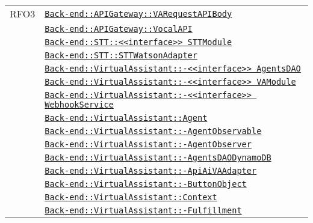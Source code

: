 \begin{longtable}{|>{\centering}m{3cm}|m{10cm}<{\centering}|}
RFO3 & \hyperref[Back-end::APIGateway::VARequestAPIBody]{\texttt{Back-end::APIGateway::VARequestAPIBody}}\\
& \hyperref[Back-end::APIGateway::VocalAPI]{\texttt{Back-end::APIGateway::VocalAPI}}\\
& \hyperref[Back-end::STT::<<interface>> STTModule]{\texttt{Back-end::STT::<<interface>> STTModule}}\\
& \hyperref[Back-end::STT::STTWatsonAdapter]{\texttt{Back-end::STT::STTWatsonAdapter}}\\
& \hyperref[Back-end::VirtualAssistant::<<interface>> AgentsDAO]{\texttt{Back-end::VirtualAssistant::-\linebreak <<interface>> AgentsDAO}}\\
& \hyperref[Back-end::VirtualAssistant::<<interface>> VAModule]{\texttt{Back-end::VirtualAssistant::-\linebreak <<interface>> VAModule}}\\
& \hyperref[Back-end::VirtualAssistant::<<interface>> WebhookService]{\texttt{Back-end::VirtualAssistant::-\linebreak <<interface>> WebhookService}}\\
& \hyperref[Back-end::VirtualAssistant::Agent]{\texttt{Back-end::VirtualAssistant::Agent}}\\
& \hyperref[Back-end::VirtualAssistant::AgentObservable]{\texttt{Back-end::VirtualAssistant::-\linebreak AgentObservable}}\\
& \hyperref[Back-end::VirtualAssistant::AgentObserver]{\texttt{Back-end::VirtualAssistant::-\linebreak AgentObserver}}\\
& \hyperref[Back-end::VirtualAssistant::AgentsDAODynamoDB]{\texttt{Back-end::VirtualAssistant::-\linebreak AgentsDAODynamoDB}}\\
& \hyperref[Back-end::VirtualAssistant::ApiAiVAAdapter]{\texttt{Back-end::VirtualAssistant::-\linebreak ApiAiVAAdapter}}\\
& \hyperref[Back-end::VirtualAssistant::ButtonObject]{\texttt{Back-end::VirtualAssistant::-\linebreak ButtonObject}}\\
& \hyperref[Back-end::VirtualAssistant::Context]{\texttt{Back-end::VirtualAssistant::Context}}\\
& \hyperref[Back-end::VirtualAssistant::Fulfillment]{\texttt{Back-end::VirtualAssistant::-\linebreak Fulfillment}}\\

\end{longtable}
